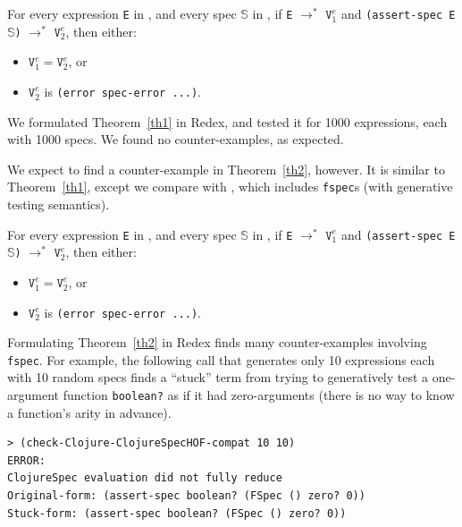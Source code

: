 \begin{theorem}
\label{th1}
For every expression \texttt{E} in \lambdac{}, 
and every spec $\mathbb{S}$ in \lambdacs{}, 
if \texttt{E} $\rightarrow^{*}$ $\texttt{V}_1^{e}$ and
\texttt{(assert-spec E $\mathbb{S}$)} $\rightarrow^{*}$ $\texttt{V}_2^{e}$,
then either:
\begin{itemize}
\item $\texttt{V}_1^{e} = \texttt{V}_2^{e}$, or
\item $\texttt{V}_2^{e}$ is \texttt{(error spec-error ...)}.
\end{itemize}
\end{theorem}

We formulated Theorem~\ref{th1} in Redex, and tested it for 1000 expressions,
each with 1000 specs. We found no counter-examples, as expected.

We expect to find a counter-example in Theorem~\ref{th2}, however.
It is similar to Theorem~\ref{th1}, except we compare \lambdac{} with
\lambdacsf{}, which includes \texttt{fspec}s (with generative testing semantics).

\begin{theorem}
\label{th2}
For every expression \texttt{E} in \lambdac{}, 
and every spec $\mathbb{S}$ in \lambdacsf{}, 
if \texttt{E} $\rightarrow^{*}$ $\texttt{V}_1^{e}$ and
\texttt{(assert-spec E $\mathbb{S}$)} $\rightarrow^{*}$ $\texttt{V}_2^{e}$,
then either:
\begin{itemize}
\item $\texttt{V}_1^{e} = \texttt{V}_2^{e}$, or
\item $\texttt{V}_2^{e}$ is \texttt{(error spec-error ...)}.
\end{itemize}
\end{theorem}

Formulating Theorem~\ref{th2} in Redex finds many counter-examples
involving \texttt{fspec}.
For example, the following call that generates only 10 expressions each with 10
random specs finds a ``stuck'' term from trying to generatively test a one-argument
function \texttt{boolean?} as if it had zero-arguments (there is no way to know
a function's arity in advance).

\begin{verbatim}
> (check-Clojure-ClojureSpecHOF-compat 10 10)
ERROR:
ClojureSpec evaluation did not fully reduce
Original-form: (assert-spec boolean? (FSpec () zero? 0))
Stuck-form: (assert-spec boolean? (FSpec () zero? 0))
\end{verbatim}

